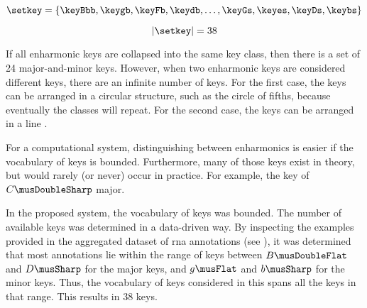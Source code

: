
\begin{equation}
    \setkey = \{ \keyBbb, \keygb, \keyFb, \keydb, \dotsc,
    \keyGs, \keyes, \keyDs, \keybs \}
\end{equation}

\begin{equation}
    | \setkey | = 38
\end{equation}

If all enharmonic keys are collapsed into the same key
class, then there is a set of 24 major-and-minor keys.
However, when two enharmonic keys are considered different
keys, there are an infinite number of keys. For the first
case, the keys can be arranged in a circular structure, such
as the circle of fifths, because eventually the classes will
repeat. For the second case, the keys can be arranged in a
line \parencite{temperley2000line}.

For a computational system, distinguishing between
enharmonics is easier if the vocabulary of keys is bounded.
Furthermore, many of those keys exist in theory, but would
rarely (or never) occur in practice. For example, the key of
$C\musDoubleSharp$ major.

In the proposed system, the vocabulary of keys was bounded.
The number of available keys was determined in a data-driven
way. By inspecting the examples provided in the aggregated
dataset of \gls{rna} annotations (see
), it was determined
that most annotations lie within the range of keys between
$B\musDoubleFlat$ and $D\musSharp$ for the major keys, and
$g\musFlat$ and $b\musSharp$ for the minor keys. Thus, the
vocabulary of keys considered in this \thesisdiss{} spans
all the keys in that range. This results in 38 keys.
